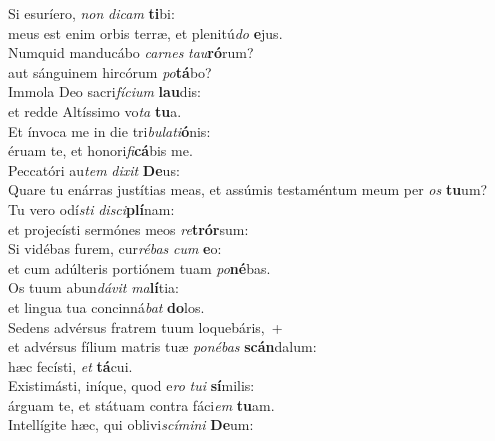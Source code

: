 \oddverse Si esuríero, \textit{non} \textit{di}\textit{cam} \textbf{ti}bi:~\*\\
\oddverse meus est enim orbis terræ, et plenitú\textit{do} \textbf{e}jus.\\
\evenverse Numquid manducábo \textit{car}\textit{nes} \textit{tau}\textbf{ró}rum?~\*\\
\evenverse aut sánguinem hircórum \textit{po}\textbf{tá}bo?\\
\oddverse Immola Deo sacri\textit{fí}\textit{ci}\textit{um} \textbf{lau}dis:~\*\\
\oddverse et redde Altíssimo vo\textit{ta} \textbf{tu}a.\\
\evenverse Et ínvoca me in die tri\textit{bu}\textit{la}\textit{ti}\textbf{ó}nis:~\*\\
\evenverse éruam te, et honori\textit{fi}\textbf{cá}bis me.\\
\oddverse Peccatóri au\textit{tem} \textit{di}\textit{xit} \textbf{De}us:~\*\\
\oddverse Quare tu enárras justítias meas, et assúmis testaméntum meum per \textit{os} \textbf{tu}um?\\
\evenverse Tu vero odí\textit{sti} \textit{di}\textit{sci}\textbf{plí}nam:~\*\\
\evenverse et projecísti sermónes meos \textit{re}\textbf{trór}sum:\\
\oddverse Si vidébas furem, cur\textit{ré}\textit{bas} \textit{cum} \textbf{e}o:~\*\\
\oddverse et cum adúlteris portiónem tuam \textit{po}\textbf{né}bas.\\
\evenverse Os tuum abun\textit{dá}\textit{vit} \textit{ma}\textbf{lí}tia:~\*\\
\evenverse et lingua tua concinná\textit{bat} \textbf{do}los.\\
\oddverse Sedens advérsus fratrem tuum loquebáris,~+\\
\oddverse  et advérsus fílium matris tuæ \textit{po}\textit{né}\textit{bas} \textbf{scán}dalum:~\*\\
\oddverse hæc fecísti, \textit{et} \textbf{tá}cui.\\
\evenverse Existimásti, iníque, quod e\textit{ro} \textit{tu}\textit{i} \textbf{sí}milis:~\*\\
\evenverse árguam te, et státuam contra fáci\textit{em} \textbf{tu}am.\\
\oddverse Intellígite hæc, qui oblivi\textit{scí}\textit{mi}\textit{ni} \textbf{De}um:~\*\\
